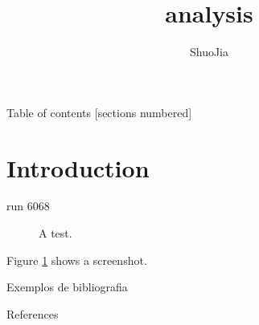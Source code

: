 \documentclass[10pt]{beamer}
\title{analysis}
\date{}
\author{ShuoJia}
\institute{Temple University}
\begin{document}
\maketitle

\begin{frame}{Table of contents}
  [sections numbered]
  \tableofcontents[hideallsubsections]
\end{frame}

\section{Introduction}

\begin{frame}[fragile]{run 6068}
  \begin{figure}
  \caption{A test.}
  \label{fig:test1}
\end{figure}

Figure \ref{fig:test1} shows a screenshot.
\end{frame}

\begin{frame}{Exemplos de bibliografia}
    
\end{frame}

\begin{frame}[allowframebreaks]{References}

  
  

\end{frame}
\end{document}
